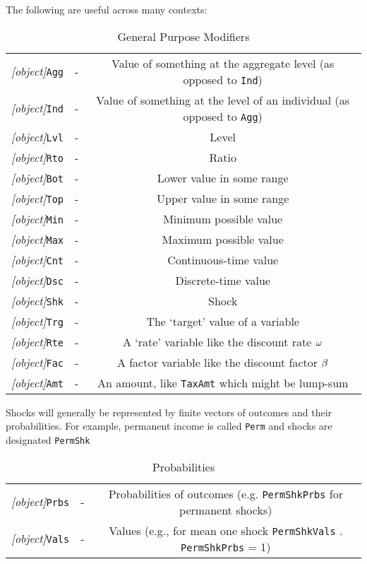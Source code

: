 
The following are useful across many contexts:
\begin{table}[h]
	\centering
	\begin{tabular}{||>{\ttfamily}ccc||}
		\hline
   \textit{[object]}\texttt{Agg} & - & Value of something at the aggregate level (as opposed to \texttt{Ind})
\\ \textit{[object]}\texttt{Ind} & - & Value of something at the level of an individual (as opposed to \texttt{Agg})
\\ \textit{[object]}\texttt{Lvl} & - & Level
\\ \textit{[object]}\texttt{Rto} & - & Ratio
\\ \textit{[object]}\texttt{Bot} & - & Lower value in some range
\\ \textit{[object]}\texttt{Top} & - & Upper value in some range
\\ \textit{[object]}\texttt{Min} & - & Minimum possible value
\\ \textit{[object]}\texttt{Max} & - & Maximum possible value
\\ \textit{[object]}\texttt{Cnt} & - & Continuous-time value
\\ \textit{[object]}\texttt{Dsc} & - & Discrete-time value
\\ \textit{[object]}\texttt{Shk} & - & Shock
\\ \textit{[object]}\texttt{Trg} & - & The `target' value of a variable
\\ \textit{[object]}\texttt{Rte} & - & A `rate' variable like the discount rate $\omega$
\\ \textit{[object]}\texttt{Fac} & - & A factor variable like the discount factor $\beta$
\\ \textit{[object]}\texttt{Amt} & - & An amount, like \texttt{TaxAmt} which might be lump-sum
\\ 	\hline
	\end{tabular}
	\caption{General Purpose Modifiers}
	\label{table:General}
\end{table}

Shocks will generally be represented by finite vectors of outcomes and their probabilities.  For example, permanent income is called \texttt{Perm} and shocks are designated \texttt{PermShk}
\begin{table}[h]
	\centering
	\begin{tabular}{||>{\ttfamily}ccc||}
		\hline
   \textit{[object]}\texttt{Prbs} & - & Probabilities of outcomes (e.g. \texttt{PermShkPrbs} for permanent shocks)
\\ \textit{[object]}\texttt{Vals} & - & Values (e.g., for mean one shock \texttt{PermShkVals} . \texttt{PermShkPrbs} = 1)
\\ 	\hline
	\end{tabular}
	\caption{Probabilities}
	\label{table:Probabilities}
\end{table}



